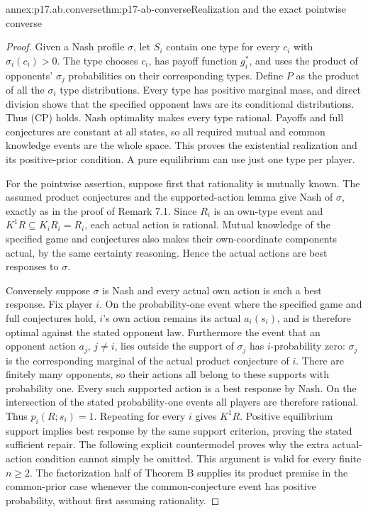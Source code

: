 \begin{annexitem}{annex:p17.ab.converse}{thm:p17-ab-converse}{Realization and the exact pointwise converse}
\begin{proof}
Given a Nash profile \(\sigma\), let \(S_i\) contain one
type for every \(c_i\) with \(\sigma_i(c_i)>0\). The type
chooses \(c_i\), has payoff function \(g_i^*\), and uses
the product of opponents' \(\sigma_j\) probabilities on
their corresponding types. Define \(P\) as the product
of all the \(\sigma_i\) type distributions.
Every type has positive marginal mass, and direct division
shows that the specified opponent laws are its conditional
distributions. Thus (CP) holds. Nash optimality makes
every type rational. Payoffs and full conjectures are
constant at all states, so all required mutual and common
knowledge events are the whole space. This proves the
existential realization and its positive-prior condition.
A pure equilibrium can use just one type per player.

For the pointwise assertion, suppose first that rationality
is mutually known. The assumed product conjectures and the
supported-action lemma give Nash of \(\sigma\), exactly as
in the proof of Remark 7.1.
Since \(R_i\) is an own-type event and \(K^1R\subseteq K_iR_i=R_i\),
each actual action is rational. Mutual knowledge of the
specified game and conjectures also makes their own-coordinate
components actual, by the same certainty reasoning.
Hence the actual actions are best responses to \(\sigma\).

Conversely suppose \(\sigma\) is Nash and every actual own
action is such a best response. Fix player \(i\).
On the probability-one event where the
specified game and full conjectures hold, \(i\)'s own
action remains its actual \(a_i(s_i)\), and is therefore
optimal against the stated opponent law. Furthermore the
event that an opponent action \(a_j\), \(j\ne i\), lies
outside the support of \(\sigma_j\) has \(i\)-probability zero:
\(\sigma_j\) is the corresponding marginal of the actual
product conjecture of \(i\). There are finitely many opponents,
so their actions all belong to these supports with probability one.
Every such supported action is a best response by Nash.
On the intersection of the stated probability-one events all
players are therefore rational. Thus \(p_i(R;s_i)=1\).
Repeating for every \(i\) gives \(K^1R\).
Positive equilibrium support implies best response by the
same support criterion, proving the stated sufficient repair.
The following explicit countermodel proves why the extra
actual-action condition cannot simply be omitted.
This argument is valid for every finite \(n\geq2\).
The factorization half of Theorem B supplies its product premise
in the common-prior case whenever the common-conjecture event
has positive probability, without first assuming rationality.


\end{proof}
\end{annexitem}
